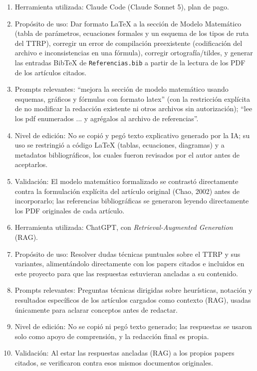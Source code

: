 \documentclass[letter, 10pt]{article}
\begin{document}
\begin{enumerate}

\item Herramienta utilizada: Claude Code (Claude Sonnet 5), plan de pago.

\item Prop\'osito de uso: Dar formato LaTeX a la secci\'on de Modelo Matem\'atico (tabla de par\'ametros, ecuaciones formales y un esquema de los tipos de ruta del TTRP), corregir un error de compilaci\'on preexistente (codificaci\'on del archivo e inconsistencias en una f\'ormula), corregir ortograf\'ia/tildes, y generar las entradas BibTeX de \texttt{Referencias.bib} a partir de la lectura de los PDF de los art\'iculos citados.

\item Prompts relevantes: ``mejora la secci\'on de modelo matem\'atico usando esquemas, gr\'aficos y f\'ormulas con formato latex'' (con la restricci\'on expl\'icita de no modificar la redacci\'on existente ni otros archivos sin autorizaci\'on); ``lee los pdf enumerados ... y agr\'egalos al archivo de referencias''.

\item Nivel de edici\'on: No se copi\'o y peg\'o texto explicativo generado por la IA; su uso se restringi\'o a c\'odigo LaTeX (tablas, ecuaciones, diagramas) y a metadatos bibliogr\'aficos, los cuales fueron revisados por el autor antes de aceptarlos.

\item Validaci\'on: El modelo matem\'atico formalizado se contrast\'o directamente contra la formulaci\'on expl\'icita del art\'iculo original (Chao, 2002) antes de incorporarlo; las referencias bibliogr\'aficas se generaron leyendo directamente los PDF originales de cada art\'iculo.

\item Herramienta utilizada: ChatGPT, con \emph{Retrieval-Augmented Generation} (RAG).

\item Prop\'osito de uso: Resolver dudas t\'ecnicas puntuales sobre el TTRP y sus variantes, aliment\'andolo directamente con los papers citados e incluidos en este proyecto para que las respuestas estuvieran ancladas a su contenido.

\item Prompts relevantes: Preguntas t\'ecnicas dirigidas sobre heur\'isticas, notaci\'on y resultados espec\'ificos de los art\'iculos cargados como contexto (RAG), usadas \'unicamente para aclarar conceptos antes de redactar.

\item Nivel de edici\'on: No se copi\'o ni peg\'o texto generado; las respuestas se usaron solo como apoyo de comprensi\'on, y la redacci\'on final es propia.

\item Validaci\'on: Al estar las respuestas ancladas (RAG) a los propios papers citados, se verificaron contra esos mismos documentos originales.

\end{enumerate}
\end{document}

